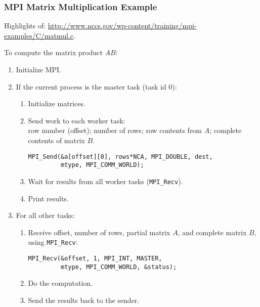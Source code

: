 \documentclass[aspectratio=43]{beamer}
\newenvironment{changemargin}[1]{%
  \begin{list}{}{%
    \setlength{\topsep}{0pt}%
    \setlength{\leftmargin}{#1}%
    \setlength{\rightmargin}{1em}
    \setlength{\listparindent}{\parindent}%
    \setlength{\itemindent}{\parindent}%
    \setlength{\parsep}{\parskip}%
  }%
  \item[]}{\end{list}}
\begin{document}
\begin{frame}[fragile]
  \frametitle{MPI Matrix Multiplication Example}

 Highlights of:
   {\scriptsize \url{http://www.nccs.gov/wp-content/training/mpi-examples/C/matmul.c}}.\\
  \begin{changemargin}{2cm}

  To compute the matrix product $AB$:
\begin{enumerate}
\item Initialize MPI.
\item If the current process is the master task (task id 0):
\begin{enumerate}
\item Initialize matrices.
\item Send work to each worker task: \\
row number (offset); number of rows;
row contents from $A$; complete contents of matrix $B$.

{\scriptsize
\begin{verbatim}
MPI_Send(&a[offset][0], rows*NCA, MPI_DOUBLE, dest, 
         mtype, MPI_COMM_WORLD);
\end{verbatim}
}

\item Wait for results from all worker tasks (\verb+MPI_Recv+).
\item Print results.
\end{enumerate}
\item For all other tasks:
\begin{enumerate}
\item Receive offset, number of rows, partial matrix $A$, and complete matrix $B$, using {\tt MPI\_Recv}:

{\scriptsize
\begin{verbatim}
MPI_Recv(&offset, 1, MPI_INT, MASTER, 
         mtype, MPI_COMM_WORLD, &status);
\end{verbatim}
}
\item Do the computation.
\item Send the results back to the sender.
\end{enumerate}
\end{enumerate}
  \end{changemargin}
\end{frame}
\end{document}
